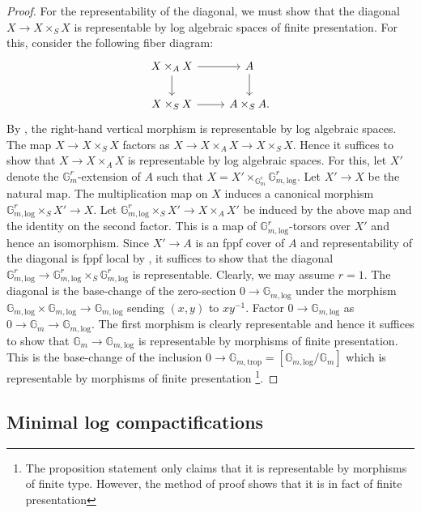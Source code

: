 \documentclass[11pt]{amsart}
\theoremstyle{definition}
\theoremstyle{remark}
\def\log{\mathrm{log}}
\def\trop{\mathrm{trop}}
\begin{document}
\begin{proof}
	For the representability of the diagonal, we must show that the diagonal
	$X\to X\times_S X$ is representable by log algebraic spaces of finite presentation.
	For this, consider the following fiber diagram:
	$$\begin{tikzcd}
		X\times_A X\arrow[d]\arrow[r]&A\arrow[d]\\
		X\times_S X\arrow[r]&A\times_S A.
	\end{tikzcd}$$
	By \cite[Proposition 10.5]{LogarithmicAbeKajiwa2015}, the
	right-hand vertical morphism is representable by log algebraic
	spaces. The map $X\to X\times_S X$ factors as
	$X\to X\times_A X\to X\times_S X$. Hence it suffices to show
	that $X\to X\times_A X$ is representable by log algebraic spaces.
	For this, let $X'$ denote the $\mathbb{G}_{m}^{r}$-extension
	of $A$ such that
	$X=X'\times_{\mathbb{G}_{m}^{r}}\mathbb{G}_{m,\log}^{r}$.
	Let $X'\to X$ be the natural map. The multiplication map
	on $X$ induces a canonical morphism $\mathbb{G}_{m,\log}^{r}\times_S X'\to X$.
	Let $\mathbb{G}_{m,\log}^{r}\times_S X'\to X\times_A X'$
	be induced by the above map and the identity on the second factor.
	This is a map of $\mathbb{G}_{m,\log}^{r}$-torsors over $X'$
	and hence an isomorphism. Since $X'\to A$ is an fppf cover
	of $A$ and representability of the diagonal is fppf local by \cite[Tag 0ADV]{stacks-project},
	it suffices to show that the diagonal
	$\mathbb{G}_{m,\log}^{r}\to \mathbb{G}_{m,\log}^{r}\times_S \mathbb{G}_{m,\log}^{r}$
	is representable. Clearly, we may assume $r=1$. The diagonal
	is the base-change of the zero-section $0\to \mathbb{G}_{m,\log}$
	under the morphism $\mathbb{G}_{m,\log}\times \mathbb{G}_{m,\log}\to \mathbb{G}_{m,\log}$
	sending $(x,y)$ to $xy^{-1}$. Factor $0\to \mathbb{G}_{m,\log}$
	as $0\to \mathbb{G}_{m}\to \mathbb{G}_{m,\log}$. The first morphism
	is clearly representable and hence it suffices to show
	that $\mathbb{G}_{m}\to \mathbb{G}_{m,\log}$ is representable
	by morphisms of finite presentation.
	This is the base-change of the inclusion $0\to \mathbb{G}_{m,\trop}=[\mathbb{G}_{m,\log}/\mathbb{G}_{m}]$
	which is representable by morphisms of finite presentation \cite[Proposition 2.2.7.5]{TheLogarithmicMolcho2022}\footnote{The proposition
		statement only claims that it is representable by morphisms of finite type.
	However, the method of proof shows that it is in fact of finite presentation}.
\end{proof}

\subsection{Minimal log compactifications}
\end{document}
